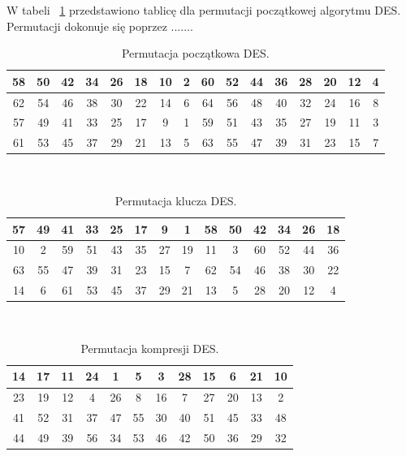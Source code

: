 \documentclass[12p]{article}
\begin{document}
W tabeli ~\ref{per_poczatkowa} przedstawiono tablicę dla permutacji początkowej algorytmu DES. Permutacji dokonuje się poprzez .......

\begin{table}[!h]
\centering
\begin{tabular}{|c|c|c|c|c|c|c|c|c|c|c|c|c|c|c|c|}
\hline
58 & 50 & 42 & 34 & 26 & 18 & 10 & 2 & 60 & 52 & 44 & 36 & 28 & 20 & 12 & 4\\
\hline
62 & 54 & 46 & 38 & 30 & 22 & 14 & 6 & 64 & 56 & 48 & 40 & 32 & 24 & 16 & 8\\
\hline
57 & 49 & 41 & 33 & 25 & 17 & 9 & 1 & 59 & 51 & 43 & 35 & 27 & 19 & 11 & 3\\
\hline
61 & 53 & 45 & 37 & 29 & 21 & 13 & 5 & 63 & 55 & 47 & 39 & 31 & 23 & 15 & 7\\
\hline
\end{tabular}
\caption{Permutacja początkowa DES.}~\label{per_poczatkowa}
\end{table}
 
\begin{table}[!h]
\centering
\begin{tabular}{|c|c|c|c|c|c|c|c|c|c|c|c|c|c|}
\hline
57 & 49 & 41 & 33 & 25 & 17 & 9 & 1 & 58 & 50 & 42 & 34 & 26 & 18\\
\hline
10 & 2 & 59 & 51 & 43 & 35 & 27 & 19 & 11 & 3 & 60 & 52 & 44 & 36\\
\hline
63 & 55 & 47 & 39 & 31 & 23 & 15 & 7 & 62 & 54 & 46 & 38 & 30 & 22\\
\hline
14 & 6 & 61 & 53 & 45 & 37 & 29 & 21 & 13 & 5 & 28 & 20 & 12 & 4 \\
\hline
\end{tabular}
\caption{Permutacja klucza DES.}~\label{per_klucza}
\end{table}
 
\begin{table}[!h]
\centering
\begin{tabular}{|c|c|c|c|c|c|c|c|c|c|c|c|}
\hline
14 & 17 & 11 & 24 & 1 & 5 & 3 & 28 & 15 & 6 & 21 & 10\\
\hline
23 & 19 & 12 & 4 & 26 & 8 & 16 & 7 & 27 & 20 & 13 & 2\\
\hline
41 & 52 & 31 & 37 & 47 & 55 & 30 & 40 & 51 & 45 & 33 & 48\\
\hline
44 & 49 & 39 & 56 & 34 & 53 & 46 & 42 & 50 & 36 & 29 & 32\\
\hline
\end{tabular}
\caption{Permutacja kompresji DES.}~\label{per_kompresji}
\end{table}
\end{document}
